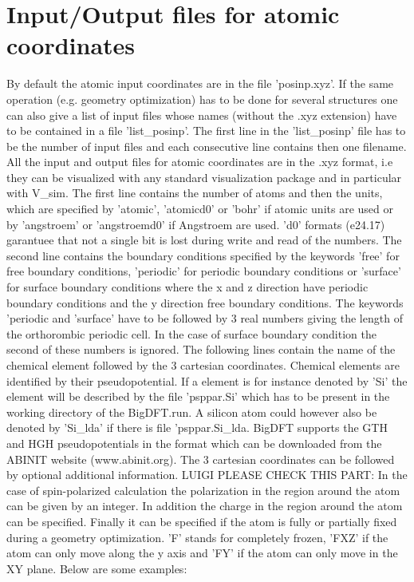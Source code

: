 \documentclass[a4paper,11pt]{report}
\begin{document}
\section{Input/Output files for atomic coordinates } 
By default the atomic input coordinates are in the file 'posinp.xyz'. If the same operation (e.g. geometry optimization) 
has to be done for several structures one can also give a list of input files whose names (without the .xyz extension) 
have to be contained in a file 'list\_posinp'. The first line in the 'list\_posinp' file has to be the number of input 
files and each consecutive line contains then one filename. 
All the input and output files for atomic coordinates are in the .xyz format, i.e they can be visualized with any 
standard visualization package and in particular with V\_sim. The first line contains the number of atoms 
and then the units, which are specified by 'atomic', 'atomicd0' or 'bohr' if atomic units are used or by 
'angstroem' or 'angstroemd0' if Angstroem are used. 'd0' formats (e24.17) garantuee that not a single bit is 
lost during write and read of the numbers. 
The second line contains the boundary conditions specified by the keywords 'free' for free boundary 
conditions, 'periodic' for periodic boundary conditions or 'surface' for surface boundary conditions
where the x and z direction have periodic boundary conditions and the y direction free boundary conditions. 
The keywords 'periodic and 'surface' have to be followed by 3 real numbers giving the length of the 
orthorombic periodic cell. In the case of surface boundary condition the second of these numbers is ignored. 
The following lines contain the name of the chemical element followed by the 3 cartesian coordinates. 
Chemical elements are identified by their pseudopotential. If a element is for instance denoted by 
'Si' the element will be described by the file 'psppar.Si' which has to be present in the working directory 
of the BigDFT.run. A silicon atom could however also be denoted by 'Si\_lda' if there is file 'psppar.Si\_lda.
BigDFT supports the GTH and HGH pseudopotentials in the format which can be downloaded from the ABINIT website
(www.abinit.org). The 3 cartesian coordinates can be followed by optional additional information.
LUIGI PLEASE CHECK THIS PART:
In the case of spin-polarized calculation the polarization in the region around the atom can 
be given by an integer. In addition the charge in the region around the atom can be specified.
Finally it can be specified if the atom is fully or partially fixed during a geometry optimization.
'F' stands for completely frozen, 'FXZ' if the atom can only move along the y axis and 'FY' if the atom 
can only move in the XY plane. Below are some examples:
\end{document}
